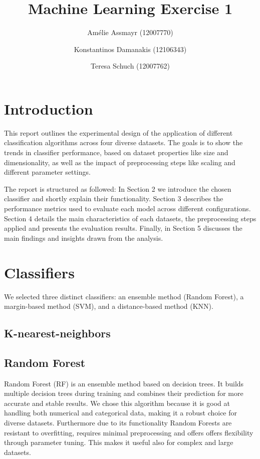 \documentclass{article}
\title{Machine Learning Exercise 1}
\author{Amélie Assmayr (12007770) \and
        Konstantinos Damanakis (12106343) \and
        Teresa Schuch (12007762)}
\begin{document}
\maketitle

\section{Introduction}
This report outlines the experimental design of the application of different classification algorithms across four diverse datasets. The goals is to show the trends in classifier performance, based on dataset properties like size and dimensionality, as well as the impact of preprocessing steps like scaling and different parameter settings.

The report is structured as followed: In Section 2 we introduce the chosen classifier and shortly explain their functionality. Section 3 describes the performance metrics used to evaluate each model across different configurations. Section 4 details the main characteristics of each datasets, the preprocessing steps applied and presents the evaluation results. Finally, in Section 5 discusses the main findings and insights drawn from the analysis.

\section{Classifiers}
We selected three distinct classifiers: an ensemble method (Random Forest), a margin-based method (SVM), and a distance-based method (KNN).

\subsection{K-nearest-neighbors}
\subsection{Random Forest}
Random Forest (RF) is an ensemble  method based on decision trees. It builds multiple decision trees during training and combines their prediction for more accurate and stable results. We chose this algorithm because it is good at handling both numerical and categorical data, making it a robust choice for diverse datasets. Furthermore due to its functionality Random Forests are resistant to overfitting, requires minimal preprocessing and offers offers flexibility through parameter tuning. This makes it useful also for complex and large datasets.
\end{document}
